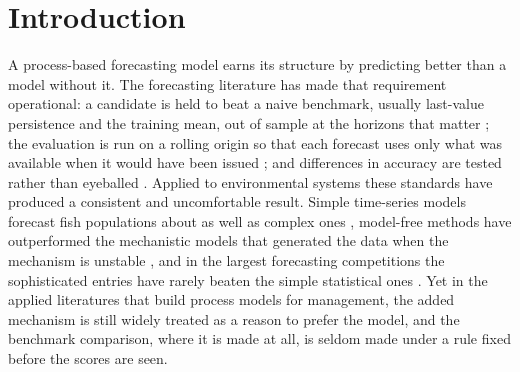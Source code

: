 \documentclass[preprint,11pt,authoryear]{elsarticle}
\theoremstyle{definition}
\theoremstyle{remark}
\begin{document}
\section{Introduction}\label{sec:intro}

A process-based forecasting model earns its structure by predicting better than a model without it. The forecasting literature has made that requirement operational: a candidate is held to beat a naive benchmark, usually last-value persistence and the training mean, out of sample at the horizons that matter \citep{Makridakis2000,HyndmanKoehler2006,HyndmanAthanasopoulos2021}; the evaluation is run on a rolling origin so that each forecast uses only what was available when it would have been issued \citep{Tashman2000,Bergmeir2012}; and differences in accuracy are tested rather than eyeballed \citep{Diebold1995,Harvey1997,Diebold2015}. Applied to environmental systems these standards have produced a consistent and uncomfortable result. Simple time-series models forecast fish populations about as well as complex ones \citep{Ward2014}, model-free methods have outperformed the mechanistic models that generated the data when the mechanism is unstable \citep{Perretti2013}, and in the largest forecasting competitions the sophisticated entries have rarely beaten the simple statistical ones \citep{Makridakis2000,Makridakis2018}. Yet in the applied literatures that build process models for management, the added mechanism is still widely treated as a reason to prefer the model, and the benchmark comparison, where it is made at all, is seldom made under a rule fixed before the scores are seen.
\end{document}
